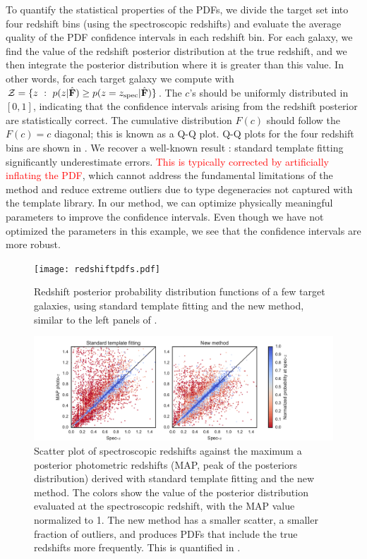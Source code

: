 \documentclass[aps,prd,showpacs,superscriptaddress,groupedaddress]{revtex4}  %
\newcommand{\bl}[1]{\textcolor{red}{#1}}
\begin{document}
To quantify the statistical properties of the PDFs, we divide the target set into four redshift bins (using the spectroscopic redshifts) and evaluate the average quality of the PDF confidence intervals in each redshift bin.
For each galaxy, we find the value of the redshift posterior distribution at the true redshift, and we then integrate the posterior distribution where it is greater than this value.
In other words, for each target galaxy we compute
with $\mathcal{Z} = \{ z \ : \ p(z | \hat{\mat{F}})  \ge p(z=z_{\mathrm{spec}} | \hat{\mat{F}}) \}$.
The $c$'s should be uniformly distributed in $[0, 1]$, indicating that the confidence intervals arising from the redshift posterior are statistically correct. 
The cumulative distribution $F(c)$ should follow the $F(c)=c$ diagonal; this is known as a Q-Q plot.  
Q-Q plots for the four redshift bins are shown in .
We recover a well-known result \citep[\eg][]{Wittman:2016}: standard template fitting significantly underestimate \photoz errors.
\bl{This is typically corrected by artificially inflating the PDF}, which cannot address the fundamental limitations of the method and reduce extreme outliers due to type degeneracies not captured with the template library.
In our method, we can optimize physically meaningful parameters to improve the confidence intervals.
Even though we have not optimized the parameters in this example, we see that the confidence intervals are more robust.

\begin{figure}
\texttt{[image: redshiftpdfs.pdf]}
\caption{Redshift posterior probability distribution functions of a few target galaxies, using standard template fitting and the new method, similar to the left panels of .}
\label{fig:redshiftpdfs}
\end{figure}

\begin{figure}
\includegraphics[width=16cm, trim = 1.8cm 0cm 3.5cm 0cm, clip]{zmean_vs_zspec.pdf}
\caption{Scatter plot of spectroscopic redshifts against the maximum a posterior photometric redshifts (MAP, peak of the posteriors distribution) derived with standard template fitting and the new method. 
The colors show the value of the posterior distribution evaluated at the spectroscopic redshift, with the MAP value normalized to 1.
The new method has a smaller scatter, a smaller fraction of outliers, and produces PDFs that include the true redshifts more frequently.
This is quantified in .
}
\label{fig:zmean_vs_zspec}
\end{figure}
\end{document}

